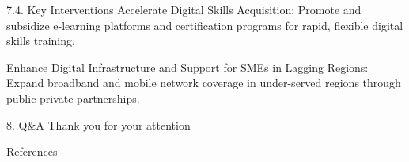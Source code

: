 \documentclass[
  ignorenonframetext,
]{beamer}
\newif\ifbibliography
\begin{document}
\begin{frame}{7.4. Key Interventions}
\label{key-interventions}
Accelerate Digital Skills Acquisition: Promote and subsidize e-learning
platforms and certification programs for rapid, flexible digital skills
training.

Enhance Digital Infrastructure and Support for SMEs in Lagging Regions:
Expand broadband and mobile network coverage in under-served regions
through public-private partnerships.
\end{frame}

\begin{frame}{8. Q\&A}
\label{qa}
Thank you for your attention
\end{frame}

\renewcommand\refname{References}
\begin{frame}[allowframebreaks]{References}
  \bibliographytrue
  
\end{frame}
\end{document}
